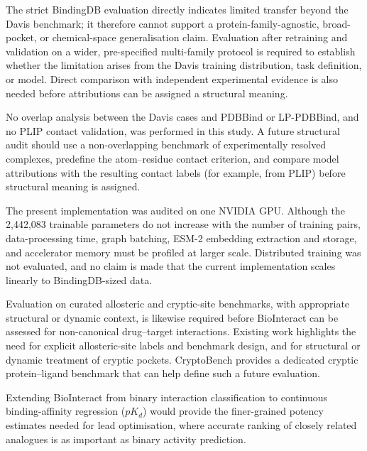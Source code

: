 \documentclass[fleqn,10pt]{wlscirep}
\begin{document}
The strict BindingDB evaluation directly indicates limited transfer beyond the
Davis benchmark; it therefore cannot support a protein-family-agnostic,
broad-pocket, or chemical-space generalisation claim. Evaluation after
retraining and validation on a wider, pre-specified multi-family protocol is
required to establish whether the limitation arises from the Davis training
distribution, task definition, or model. Direct comparison with independent
experimental evidence is also needed before attributions can be assigned a
structural meaning.

\begingroup\color{red}
No overlap analysis between the Davis cases and PDBBind or LP-PDBBind, and no
PLIP contact validation, was performed in this study. A future structural audit
should use a non-overlapping benchmark of experimentally resolved complexes,
predefine the atom--residue contact criterion, and compare model attributions
with the resulting contact labels (for example, from PLIP) before structural
meaning is assigned.\cite{salentin2015plip}

The present implementation was audited on one NVIDIA GPU. Although the
2{,}442{,}083 trainable parameters do not increase with the number of training
pairs, data-processing time, graph batching, ESM-2 embedding extraction and
storage, and accelerator memory must be profiled at larger scale. Distributed
training was not evaluated, and no claim is made that the current implementation
scales linearly to BindingDB-sized data.
\endgroup

\begingroup\color{red}
Evaluation on curated allosteric and cryptic-site benchmarks, with appropriate
structural or dynamic context, is likewise required before BioInteract can be
assessed for non-canonical drug--target interactions.  Existing work highlights
the need for explicit allosteric-site labels and benchmark design,\cite{wu2022allostericbenchmark,gatlin2026allostericgrammar}
and for structural or dynamic treatment of cryptic pockets.\cite{zhang2026crypticpockets}
CryptoBench provides a dedicated cryptic protein--ligand benchmark that can help
define such a future evaluation.\cite{skrhak2024cryptobench}
\endgroup

Extending BioInteract from binary interaction classification to
continuous binding-affinity regression ($pK_d$) would provide the finer-grained
potency estimates needed for lead optimisation, where accurate ranking of closely
related analogues is as important as binary activity prediction.

\endgroup
\end{document}
